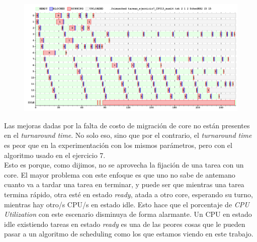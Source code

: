 \begin{figure}[h]
	\centering                                                       
	\includegraphics[width=450pt]{./figs/ejercicio8_2cores_quantum15.png}
\end{figure}

\clearpage

Las mejoras dadas por la falta de costo de migración de core no están presentes en el \textit{turnaround time}. No solo eso, sino que por el contrario, el \textit{turnaround time} es peor que en la experimentación con los mismos parámetros, pero con el algoritmo usado en el ejercicio 7.\\
\indent Esto es porque, como dijimos, no se aprovecha la fijación de una tarea con un core. El mayor problema con este enfoque es que uno no sabe de antemano cuanto va a tardar una tarea en terminar, y puede ser que mientras una tarea termina rápido, otra esté en estado \textit{ready}, atada a otro core, esperando su turno, mientras hay otro/s CPU/s en estado idle. Esto hace que el porcentaje de \textit{CPU Utilization} con este escenario disminuya de forma alarmante. Un CPU en estado idle existiendo tareas en estado \textit{ready} es una de las peores cosas que le pueden pasar a un algoritmo de scheduling como los que estamos viendo en este trabajo.